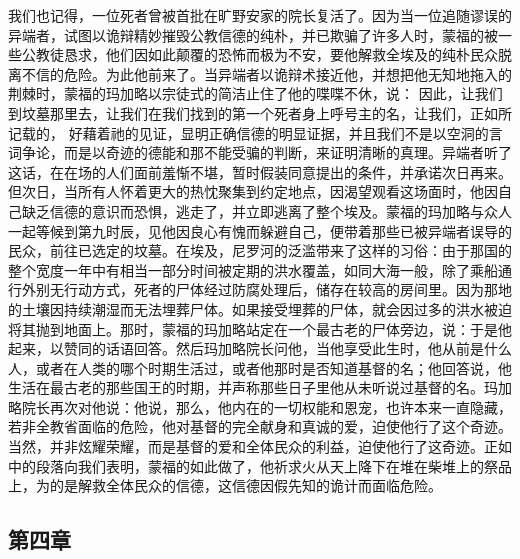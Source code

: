 我们也记得，一位死者曾被首批在旷野安家的院长复活了。因为当一位追随谬误的异端者，试图以诡辩精妙摧毁公教信德的纯朴，并已欺骗了许多人时，蒙福的被一些公教徒恳求，他们因如此颠覆的恐怖而极为不安，要他解救全埃及的纯朴民众脱离不信的危险。为此他前来了。当异端者以诡辩术接近他，并想把他无知地拖入的荆棘时，蒙福的玛加略以宗徒式的简洁止住了他的喋喋不休，说： 因此，让我们到坟墓那里去，让我们在我们找到的第一个死者身上呼号主的名，让我们，正如所记载的， 好藉着祂的见证，显明正确信德的明显证据，并且我们不是以空洞的言词争论，而是以奇迹的德能和那不能受骗的判断，来证明清晰的真理。异端者听了这话，在在场的人们面前羞惭不堪，暂时假装同意提出的条件，并承诺次日再来。但次日，当所有人怀着更大的热忱聚集到约定地点，因渴望观看这场面时，他因自己缺乏信德的意识而恐惧，逃走了，并立即逃离了整个埃及。蒙福的玛加略与众人一起等候到第九时辰，见他因良心有愧而躲避自己，便带着那些已被异端者误导的民众，前往已选定的坟墓。在埃及，尼罗河的泛滥带来了这样的习俗：由于那国的整个宽度一年中有相当一部分时间被定期的洪水覆盖，如同大海一般，除了乘船通行外别无行动方式，死者的尸体经过防腐处理后，储存在较高的房间里。因为那地的土壤因持续潮湿而无法埋葬尸体。如果接受埋葬的尸体，就会因过多的洪水被迫将其抛到地面上。那时，蒙福的玛加略站定在一个最古老的尸体旁边，说：于是他起来，以赞同的话语回答。然后玛加略院长问他，当他享受此生时，他从前是什么人，或者在人类的哪个时期生活过，或者他那时是否知道基督的名；他回答说，他生活在最古老的那些国王的时期，并声称那些日子里他从未听说过基督的名。玛加略院长再次对他说：他说，那么，他内在的一切权能和恩宠，也许本来一直隐藏，若非全教省面临的危险，他对基督的完全献身和真诚的爱，迫使他行了这个奇迹。当然，并非炫耀荣耀，而是基督的爱和全体民众的利益，迫使他行了这奇迹。正如中的段落向我们表明，蒙福的如此做了，他祈求火从天上降下在堆在柴堆上的祭品上，为的是解救全体民众的信德，这信德因假先知的诡计而面临危险。\par


\subsection{第四章}

